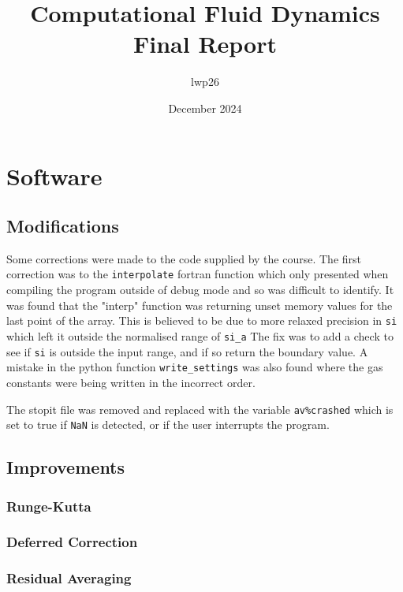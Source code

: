 \documentclass{article}
\begin{document}
\title{Computational Fluid Dynamics \\
    \large Final Report}
\author{lwp26}
\date{December 2024}
\maketitle 

\section{Software}
\subsection{Modifications}

Some corrections were made to the code supplied by the course.
The first correction was to the \texttt{interpolate} fortran function which only presented when compiling the program outside of debug mode and so was difficult to identify.
It was found that the "interp" function was returning unset memory values for the last point of the array. This is believed to be due to more relaxed precision in \texttt{si} which left it outside the normalised range of \texttt{si\_a}
The fix was to add a check to see if \texttt{si} is outside the input range, and if so return the boundary value.
A mistake in the python function \texttt{write\_settings} was also found where the gas constants were being written in the incorrect order.

The stopit file was removed and replaced with the variable \texttt{av\%crashed} which is set to true if \texttt{NaN} is detected, or if the user interrupts the program.

\subsection{Improvements}
\subsubsection{Runge-Kutta}

\subsubsection{Deferred Correction}

\subsubsection{Residual Averaging}
\end{document}
